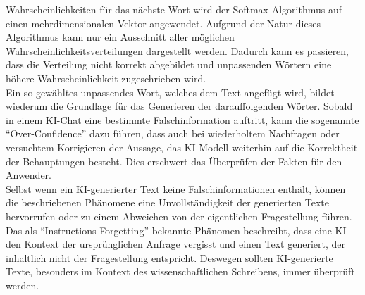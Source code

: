 \documentclass[../main.tex]{subfiles}
\begin{document}
Wahrscheinlichkeiten für das nächste Wort wird der Softmax-Algorithmus auf einen mehrdimensionalen Vektor angewendet. Aufgrund der Natur dieses Algorithmus kann nur 
ein Ausschnitt aller möglichen Wahrscheinlichkeitsverteilungen dargestellt werden. Dadurch kann es passieren, dass die Verteilung nicht korrekt abgebildet und 
unpassenden Wörtern eine höhere Wahrscheinlichkeit zugeschrieben wird.\cite{softmax} \\
Ein so gewähltes unpassendes Wort, welches dem Text angefügt wird, bildet wiederum die Grundlage für das Generieren der darauffolgenden Wörter. Sobald in einem KI-Chat eine 
bestimmte Falschinformation auftritt, kann die sogenannte "`Over-Confidence"' dazu führen, dass auch bei wiederholtem Nachfragen oder versuchtem Korrigieren der 
Aussage, das KI-Modell weiterhin auf die Korrektheit der Behauptungen besteht. Dies erschwert das Überprüfen der Fakten für den Anwender.\cite{allgemHalluzinationen,softmax} \\
Selbst wenn ein KI-generierter Text keine Falschinformationen enthält, können die beschriebenen Phänomene eine Unvollständigkeit der generierten Texte hervorrufen 
oder zu einem Abweichen von der eigentlichen Fragestellung führen.  Das als "`Instructions-Forgetting"' bekannte Phänomen beschreibt, dass eine KI den Kontext der 
ursprünglichen Anfrage vergisst und einen Text generiert, der inhaltlich nicht der Fragestellung entspricht. Deswegen sollten KI-generierte Texte, besonders im Kontext 
des wissenschaftlichen Schreibens, immer überprüft werden.\cite{allgemHalluzinationen}
\end{document}
